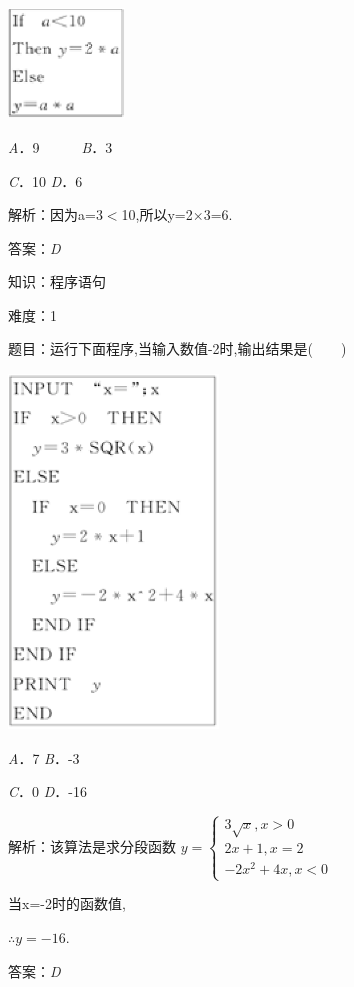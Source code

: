 \documentclass{article} %
\begin{document}
\textit{\includegraphics*[width=1.22in, height=1.17in, keepaspectratio=false]{image44}}

\textit{A}．9　　　\textit{B}．3

\textit{C}．10     \textit{D}．6

解析：因为a=3$\mathrm{<}$10,所以y=2$\mathrm{\times}$3=6.

答案：\textit{D}

知识：程序语句

难度：1

题目：运行下面程序,当输入数值-2时,输出结果是(　　)

\textit{\includegraphics*[width=2.20in, height=3.72in, keepaspectratio=false]{image45}}

\textit{A}．7  \textit{B}．-3

\textit{C}．0  \textit{D}．-16

解析：该算法是求分段函数
$y=
\left\{\begin{array}{l}
	3\sqrt{x},x>0\\
	2x+1,x=2\\
	-2x^2+4x,x<0
\end{array}\right.$

当x=-2时的函数值,

$\mathrm{\therefore}y=-16$.

答案：\textit{D}
\end{document}
